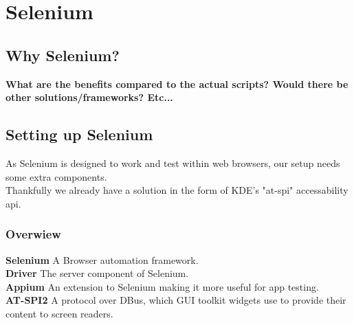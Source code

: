 \chapter{Selenium}
\section{Why Selenium?}
    \textbf{What are the benefits compared to the actual scripts?
    Would there be other solutions/frameworks? Etc...}

\section{Setting up Selenium}
    As Selenium is designed to work and test within web browsers, our setup
    needs some extra components.\\
    Thankfully we already have a solution in the form of KDE's "at-spi"
    accessability api.

\subsection{Overwiew}
    \textbf{Selenium} A Browser automation framework.\\
    \textbf{Driver} The server component of Selenium.\\
    \textbf{Appium} An extension to Selenium making it more useful for app
    testing.\\
    \textbf{AT-SPI2} A protocol over DBus, which GUI toolkit widgets use to
    provide their content to screen readers.\\

